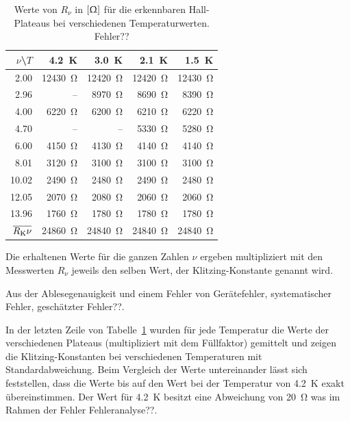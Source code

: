 \documentclass[paper=a4,fontsize=10pt,DIV=18,twocolumn,parskip=half]{scrartcl}
\numberwithin{equation}{section}    %
\renewcommand{\note}[1]{{\color{red}#1??}}
\begin{document}
\begin{table}[htp]
	\begin{center}
	\begin{tabular}{r|rrrr}
		$\nu$\textbackslash$T$ & \SI{4.2}{\kelvin} & \SI{3.0}{\kelvin} & \SI{2.1}{\kelvin} & \SI{1.5}{\kelvin} \\
		\hline
		2.00  & \SI{12430}{\ohm} & \SI{12420}{\ohm} & \SI{12420}{\ohm} & \SI{12430}{\ohm}\\
		2.96  &      \--- &  \SI{8970}{\ohm} &  \SI{8690}{\ohm} &  \SI{8390}{\ohm}\\
		4.00  &  \SI{6220}{\ohm} &  \SI{6200}{\ohm} &  \SI{6210}{\ohm} &  \SI{6220}{\ohm}\\
		4.70  &      \--- &      \--- &  \SI{5330}{\ohm} &  \SI{5280}{\ohm}\\
		6.00  &  \SI{4150}{\ohm} &  \SI{4130}{\ohm} &  \SI{4140}{\ohm} &  \SI{4140}{\ohm}\\
		8.01  &  \SI{3120}{\ohm} &  \SI{3100}{\ohm} &  \SI{3100}{\ohm} &  \SI{3100}{\ohm}\\
		10.02 &  \SI{2490}{\ohm} &  \SI{2480}{\ohm} &  \SI{2490}{\ohm} &  \SI{2480}{\ohm}\\
		12.05 &  \SI{2070}{\ohm} &  \SI{2080}{\ohm} &  \SI{2060}{\ohm} &  \SI{2060}{\ohm}\\
		13.96 &  \SI{1760}{\ohm} &  \SI{1780}{\ohm} &  \SI{1780}{\ohm} &  \SI{1780}{\ohm}\\
		\hline
		$\overline{R_{\rm K}\nu}$ & \SI{24860}{\ohm} & \SI{24840}{\ohm} & \SI{24840}{\ohm} & \SI{24840}{\ohm}
	\end{tabular}
	\caption{Werte von $R_\nu$ in $\left[\Upomega\right]$ für die erkennbaren Hall-Plateaus bei verschiedenen Temperaturwerten. \note{Fehler}}
	\label{klitzing}	
	\end{center}
\end{table}

Die erhaltenen Werte für die ganzen Zahlen $\nu$ ergeben multipliziert mit den Messwerten $R_{\nu}$ jeweils den selben Wert, der Klitzing-Konstante genannt wird. 

Aus der Ablesegenauigkeit und einem Fehler von \note{Gerätefehler, systematischer Fehler, geschätzter Fehler}.

In der letzten Zeile von Tabelle~\ref{klitzing} wurden für jede Temperatur die Werte der verschiedenen Plateaus (multipliziert mit dem Füllfaktor) gemittelt und zeigen die Klitzing-Konstanten bei verschiedenen Temperaturen mit Standardabweichung. Beim Vergleich der Werte untereinander lässt sich feststellen, dass die Werte bis auf den Wert bei der Temperatur von \SI{4.2}{\kelvin} exakt übereinstimmen. Der Wert für \SI{4.2}{\kelvin} besitzt eine Abweichung von \SI{20}{\ohm} was im Rahmen der Fehler \note{Fehleranalyse}.
\end{document}
